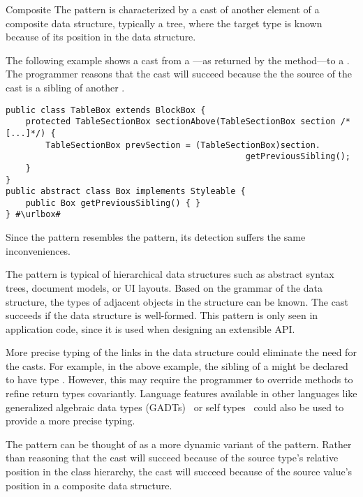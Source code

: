\begin{pattern}{Composite}
The \thisp{} pattern is characterized by a cast of another element of a
composite data structure, typically a tree, where the target type is known because of its
position in the data structure.

\instancessrc{}
The following example shows a cast from a ---as returned by the  method---to a .
The programmer reasons that the cast will succeed because the 
the source of the cast is a sibling of another .

\def\urlvar{http://bit.ly/flyingsaucerproject_flyingsaucer_2N2nYbY}
\begin{verbatim}
public class TableBox extends BlockBox {
    protected TableSectionBox sectionAbove(TableSectionBox section /*[...]*/) {
        TableSectionBox prevSection = (TableSectionBox)section.
                                                getPreviousSibling();
    }
}
public abstract class Box implements Styleable {
    public Box getPreviousSibling() { }
} #\urlbox#
\end{verbatim}


\detection{}
Since the \thisp{} pattern resembles the  pattern,
its detection suffers the same inconveniences.


\issues{}
The pattern is typical of hierarchical data structures such as abstract syntax
trees, document models, or UI layouts. Based on the grammar of 
the data structure, the types of adjacent objects in the structure can be known.
The cast succeeds if the data structure is well-formed.
This pattern is only seen in application code,
since it is used when designing an extensible API.

More precise typing of the links in the data structure could 
eliminate the need for the casts. For example, in the above example,
the sibling of a  might be declared to have type
. However, this may require the programmer to override
methods to refine return types covariantly.
Language features available in other languages like generalized algebraic data types (GADTs)~\citep{gadts} or self types~\citep{bruceChallengingTypingIssues2003,scalaIndependentlyExtensible} could also be used to provide a more precise typing.

The pattern can be thought of as a more dynamic variant of the
 pattern. Rather than
reasoning that the cast will succeed because of the source type's relative position in the 
class hierarchy, the cast will succeed because of the source value's position
in a composite data structure.

\end{pattern}
